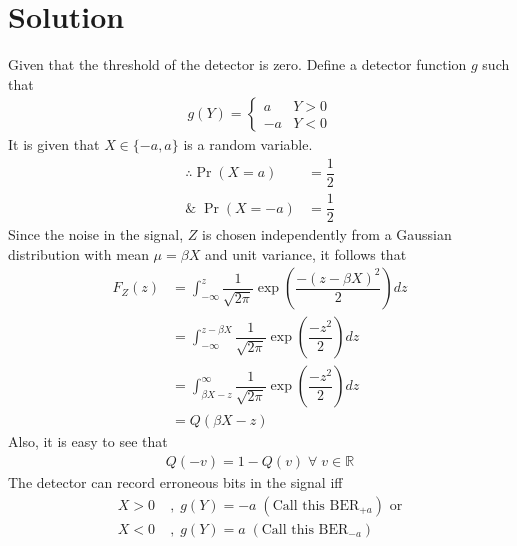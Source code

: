 \documentclass[journal,10pt,twocolumn]{IEEEtran}
\begin{document}
\section{Solution}
Given that the threshold of the detector is zero. Define a detector function $g$ such that
\begin{align}
g(Y) = 
\begin{cases}
a & Y>0 \\
-a & Y<0
\end{cases}
\end{align}
It is given that $X \in \{ -a, a\}$ is a random variable.
\begin{align}
\therefore \Pr(X=a) &= \dfrac{1}{2}\\
\& \; \Pr(X=-a) &= \dfrac{1}{2}
\end{align}
Since the noise in the signal, $Z$ is chosen independently from a Gaussian distribution with mean $ \mu = \beta X$ and unit variance, it follows that
\begin{align}
F_Z(z) &= \int_{-\infty}^{z} \dfrac{1}{\sqrt{2\pi}} \exp \left( \dfrac{-(z - \beta X)^2}{2} \right) dz \\
&= \int_{-\infty}^{z - \beta X} \dfrac{1}{\sqrt{2\pi}} \exp \left( \dfrac{-z^2}{2} \right) dz \\
&= \int_{\beta X-z}^{\infty} \dfrac{1}{\sqrt{2\pi}} \exp \left( \dfrac{-z^2}{2} \right) dz \\
&= Q(\beta X - z) \label{eqn 2.0.7}
\end{align}
Also, it is easy to see that 
\begin{align}
Q(-v) = 1 - Q(v) \; \forall \; v \in \mathbb{R} \label{eqn 2.0.8}
\end{align}
The detector can record erroneous bits in the signal iff
\begin{align}
X>0 \; &, \; g(Y) = -a \; (\text{Call this BER}_{+a}) \text{ or}\\
X<0 \; &, \; g(Y) = a \; (\text{Call this BER}_{-a})
\end{align}
\end{document}
